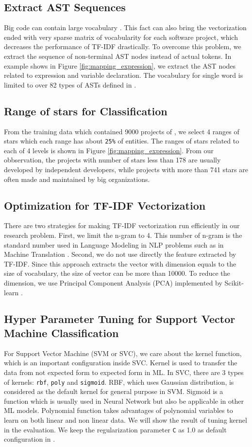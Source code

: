 \subsection{Extract AST Sequences}
Big code can contain large vocabulary \cite{015}. This fact can also bring the vectorization ended with very sparse matrix of vocabularity for each software project, which decreases the performance of TF-IDF drastically. To overcome this problem, we extract the sequence of non-terminal AST nodes instead of actual tokens. In example shows in Figure \ref{fig:mapping_expression}, we extract the AST nodes related to expression and variable declaration. The vocabulary for single word is limited to over 82 types of ASTs defined in \cite{007}.
\subsection{Range of stars for Classification}
From the training data which contained 9000 projects of \cite{013}, we select 4 ranges of stars which each range has about \texttt{25\%} of entities. The ranges of stars related to each of 4 levels is shown in Figure \ref{fig:mapping_expression}. From our obbservation, the projects with number of stars less than 178 are usually developed by independent developers, while projects with more than 741 stars are often made and maintained by big organizations.
\subsection{Optimization for TF-IDF Vectorization}
There are two strategies for making TF-IDF vectorization run efficiently in our research problem. First, we limit the n-gram to 4. This number of n-gram is the standard number used in Language Modeling in NLP problems such as in Machine Translation \cite{016}. Second, we do not use directly the feature extracted by TF-IDF. Since this approach extracts the vector with dimension equals to the size of vocabulary, the size of vector can be more than 10000. To reduce the dimension, we use Principal Component Analysis (PCA) implemented by Scikit-learn \cite{010}. 

\subsection{Hyper Parameter Tuning for Support Vector Machine Classification}
For Support Vector Machine (SVM or SVC), we care about the kernel function, which is an important configuration inside SVC. Kernel is used to transfer the data from not expected form to expected form in ML. In SVC, there are 3 types of kernels: \texttt{rbf}, \texttt{poly} and \texttt{sigmoid}. RBF, which uses Gaussian distribution, is considered as the default kernel for general purpose in SVM. Sigmoid is a function which is usually used in Neural Network but also be applicable in other ML models. Polynomial function takes advantages of polynomial variables to learn on both linear and non linear data. We will show the result of tuning kernel in the evaluation. We keep the regularization parameter \texttt{C} as 1.0 as default configuration in \cite{010}.
